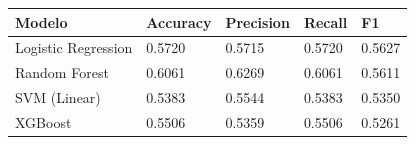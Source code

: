 \begin{tabular}{lllll}
\toprule
Modelo & Accuracy & Precision & Recall & F1 \\
\midrule
Logistic Regression & 0.5720 & 0.5715 & 0.5720 & 0.5627 \\
Random Forest & 0.6061 & 0.6269 & 0.6061 & 0.5611 \\
SVM (Linear) & 0.5383 & 0.5544 & 0.5383 & 0.5350 \\
XGBoost & 0.5506 & 0.5359 & 0.5506 & 0.5261 \\
\bottomrule
\end{tabular}

